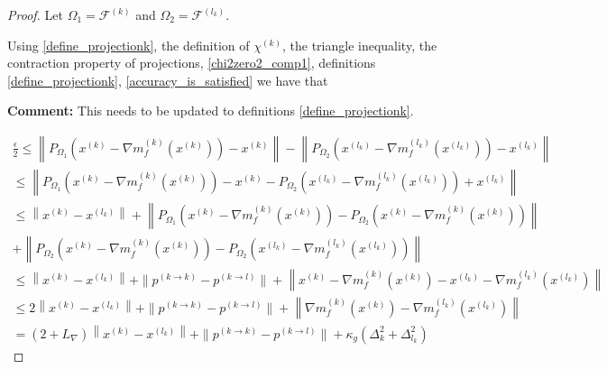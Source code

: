 \documentclass{article}
\newenvironment{comment}
  {\par\medskip
   \color{red}%
   \begin{framed}
   \textbf{Comment: }\ignorespaces}
 {\end{framed}
  \medskip}
\theoremstyle{case}
\numberwithin{theorem}{subsection}
\newcommand{\chik}{{\chi^{(k)}}}
\newcommand{\dk}{\Delta_k}
\newcommand{\feasiblek}{{\mathcal F^{(k)}}}
\newcommand{\gk}{{\nabla m_f^{(k)}\left(x^{(k)}\right)}}
\newcommand{\gradf}{\nabla f}
\newcommand{\lipgrad}{{L_{\nabla}}}
\newcommand{\xk}{{x^{(k)}}}
\begin{document}
\begin{proof}
Let $\Omega_1 = \feasiblek$ and $\Omega_2 = \mathcal F^{(l_k)}$.

Using \cref{define_projectionk}, the definition of $\chik$, the triangle inequality, the contraction property of projections, \cref{chi2zero2_comp1},
definitions \cref{define_projectionk}, \cref{accuracy_is_satisfied} we have that

\begin{comment}
This needs to be updated to definitions \cref{define_projectionk}.
\end{comment}
\begin{align*}
\frac{\epsilon}{2} \le \left \|P_{\Omega_1}\left(\xk - \gk\right) - \xk\right \| - \left\|P_{\Omega_2}\left(x^{(l_k)} - {\nabla m_f^{(l_k)}\left(x^{(l_k)}\right)}\right) - x^{(l_k)}\right\| \\
\le \left\|P_{\Omega_1}\left(\xk - \gk\right) - \xk - P_{\Omega_2}\left(x^{(l_k)} - {\nabla m_f^{(l_k)}\left(x^{(l_k)}\right)}\right) + x^{(l_k)}\right\| \\
\le\left\|\xk - x^{(l_k)}\right\| +  \left\|P_{\Omega_1}\left(\xk - \gk\right) - P_{\Omega_2}\left(\xk - \gk\right)\right\| \\+ \left\|P_{\Omega_2}\left(\xk - \gk\right) - P_{\Omega_2}\left(x^{(l_k)} - {\nabla m_f^{(l_k)}\left(x^{(l_k)}\right)}\right)\right\| \\
\le\left\|\xk - x^{(l_k)}\right\| + \| p^{(k\to k)} - p^{(k\to l)}\| + \left\|\xk - \gk - x^{(l_k)} - {\nabla m_f^{(l_k)}\left(x^{(l_k)}\right)}\right\| \\
\le 2\left\|\xk - x^{(l_k)}\right\| + \| p^{(k\to k)} - p^{(k\to l)}\| + \left\|\gk - {\nabla m_f^{(l_k)}\left(x^{(l_k)}\right)}\right\|\\
=   (2 + \lipgrad) \left\|\xk - x^{(l_k)}\right\| + \| p^{(k\to k)} - p^{(k\to l)}\| + \kappa_g \left(\dk^2 + \Delta_{l_k}^2\right)
\end{align*}




\end{proof}
\end{document}
